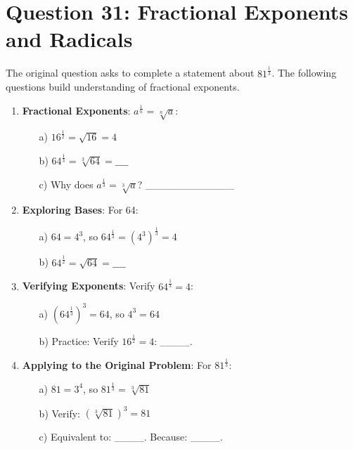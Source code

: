 \documentclass[12pt]{article}
\begin{document}
\section*{Question 31: Fractional Exponents and Radicals}
The original question asks to complete a statement about \( 81^{\frac{1}{3}} \). The following questions build understanding of fractional exponents.

\begin{enumerate}[label=31.\arabic*]
    \item \textbf{Fractional Exponents}: \( a^{\frac{1}{n}} = \sqrt[n]{a} \):
    \begin{enumerate}
        \item[a)] \( 16^{\frac{1}{2}} = \sqrt{16} = 4 \)
        \item[b)] \( 64^{\frac{1}{3}} = \sqrt[3]{64} = \_\_\_\_ \)
        \item[c)] Why does \( a^{\frac{1}{3}} = \sqrt[3]{a} \)? \_\_\_\_\_\_\_\_\_\_\_\_
    \end{enumerate}
    \item \textbf{Exploring Bases}: For 64:
    \begin{enumerate}
        \item[a)] \( 64 = 4^3 \), so \( 64^{\frac{1}{3}} = (4^3)^{\frac{1}{3}} = 4 \)
        \item[b)] \( 64^{\frac{1}{2}} = \sqrt{64} = \_\_\_\_ \)
    \end{enumerate}
    \item \textbf{Verifying Exponents}: Verify \( 64^{\frac{1}{3}} = 4 \):
    \begin{enumerate}
        \item[a)] \( (64^{\frac{1}{3}})^3 = 64 \), so \( 4^3 = 64 \)
        \item[b)] Practice: Verify \( 16^{\frac{1}{2}} = 4 \): \_\_\_\_.
    \end{enumerate}
    \item \textbf{Applying to the Original Problem}: For \( 81^{\frac{1}{3}} \):
    \begin{enumerate}
        \item[a)] \( 81 = 3^4 \), so \( 81^{\frac{1}{3}} = \sqrt[3]{81} \)
        \item[b)] Verify: \( (\sqrt[3]{81})^3 = 81 \)
        \item[c)] Equivalent to: \_\_\_\_. Because: \_\_\_\_.
    \end{enumerate}
\end{enumerate}
\end{document}
